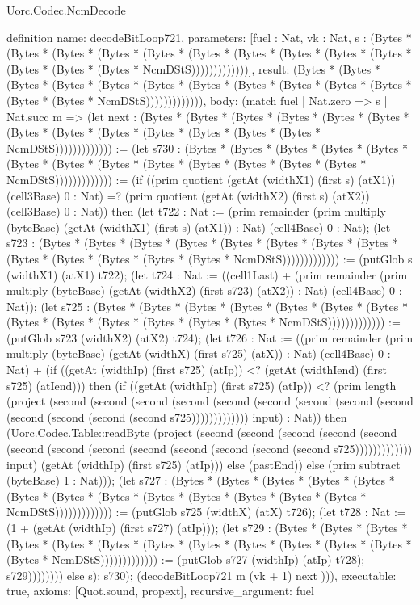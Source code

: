 \begin{lexlean}{Uorc.Codec.NcmDecode}
\begin{semanticmodule}
definition{
  name: decodeBitLoop721,
  parameters: [fuel : Nat, vk : Nat, s : (Bytes * (Bytes * (Bytes * (Bytes * (Bytes * (Bytes * (Bytes * (Bytes * (Bytes * (Bytes * (Bytes * (Bytes * (Bytes * NcmDStS)))))))))))))],
  result: (Bytes * (Bytes * (Bytes * (Bytes * (Bytes * (Bytes * (Bytes * (Bytes * (Bytes * (Bytes * (Bytes * (Bytes * (Bytes * NcmDStS))))))))))))),
  body: (match fuel
    | Nat.zero => s
    | Nat.succ m => (let next : (Bytes * (Bytes * (Bytes * (Bytes * (Bytes * (Bytes * (Bytes * (Bytes * (Bytes * (Bytes * (Bytes * (Bytes * (Bytes * NcmDStS))))))))))))) := (let s730 : (Bytes * (Bytes * (Bytes * (Bytes * (Bytes * (Bytes * (Bytes * (Bytes * (Bytes * (Bytes * (Bytes * (Bytes * (Bytes * NcmDStS))))))))))))) := (if ((prim quotient (getAt (widthX1) (first s) (atX1)) (cell3Base) 0 : Nat) =? (prim quotient (getAt (widthX2) (first s) (atX2)) (cell3Base) 0 : Nat)) then (let t722 : Nat := (prim remainder (prim multiply (byteBase) (getAt (widthX1) (first s) (atX1)) : Nat) (cell4Base) 0 : Nat); (let s723 : (Bytes * (Bytes * (Bytes * (Bytes * (Bytes * (Bytes * (Bytes * (Bytes * (Bytes * (Bytes * (Bytes * (Bytes * (Bytes * NcmDStS))))))))))))) := (putGlob s (widthX1) (atX1) t722); (let t724 : Nat := ((cell1Last) + (prim remainder (prim multiply (byteBase) (getAt (widthX2) (first s723) (atX2)) : Nat) (cell4Base) 0 : Nat)); (let s725 : (Bytes * (Bytes * (Bytes * (Bytes * (Bytes * (Bytes * (Bytes * (Bytes * (Bytes * (Bytes * (Bytes * (Bytes * (Bytes * NcmDStS))))))))))))) := (putGlob s723 (widthX2) (atX2) t724); (let t726 : Nat := ((prim remainder (prim multiply (byteBase) (getAt (widthX) (first s725) (atX)) : Nat) (cell4Base) 0 : Nat) + (if ((getAt (widthIp) (first s725) (atIp)) <? (getAt (widthIend) (first s725) (atIend))) then (if ((getAt (widthIp) (first s725) (atIp)) <? (prim length (project (second (second (second (second (second (second (second (second (second (second (second (second (second s725))))))))))))) input) : Nat)) then (Uorc.Codec.Table::readByte (project (second (second (second (second (second (second (second (second (second (second (second (second (second s725))))))))))))) input) (getAt (widthIp) (first s725) (atIp))) else (pastEnd)) else (prim subtract (byteBase) 1 : Nat))); (let s727 : (Bytes * (Bytes * (Bytes * (Bytes * (Bytes * (Bytes * (Bytes * (Bytes * (Bytes * (Bytes * (Bytes * (Bytes * (Bytes * NcmDStS))))))))))))) := (putGlob s725 (widthX) (atX) t726); (let t728 : Nat := (1 + (getAt (widthIp) (first s727) (atIp))); (let s729 : (Bytes * (Bytes * (Bytes * (Bytes * (Bytes * (Bytes * (Bytes * (Bytes * (Bytes * (Bytes * (Bytes * (Bytes * (Bytes * NcmDStS))))))))))))) := (putGlob s727 (widthIp) (atIp) t728); s729)))))))) else s); s730); (decodeBitLoop721 m (vk + 1) next ))),
  executable: true,
  axioms: [Quot.sound, propext],
  recursive_argument: fuel
}


\end{semanticmodule}
\end{lexlean}
